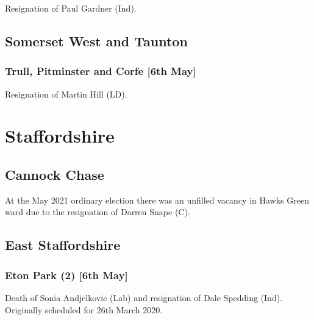 \documentclass[a4paper,openany]{book}
\begin{document}
\begin{resultsiii}

Resignation of Paul Gardner (Ind).

\subsection*{Somerset West and Taunton}

\subsubsection*{Trull, Pitminster and Corfe \hspace*{\fill}\nolinebreak[1]%
	\enspace\hspace*{\fill}
	[6th May]}


Resignation of Martin Hill (LD).

\section{Staffordshire}

\subsection*{Cannock Chase}

At the May 2021 ordinary election there was an unfilled vacancy in Hawks Green ward due to the resignation of Darren Snape (C).

\subsection*{East Staffordshire}

\subsubsection*{Eton Park (2) \hspace*{\fill}\nolinebreak[1]%
	\enspace\hspace*{\fill}
	[6th May]}


Death of Sonia Andjelkovic (Lab) and resignation of Dale Spedding (Ind).  Originally scheduled for 26th March 2020.


\end{resultsiii}
\end{document}
